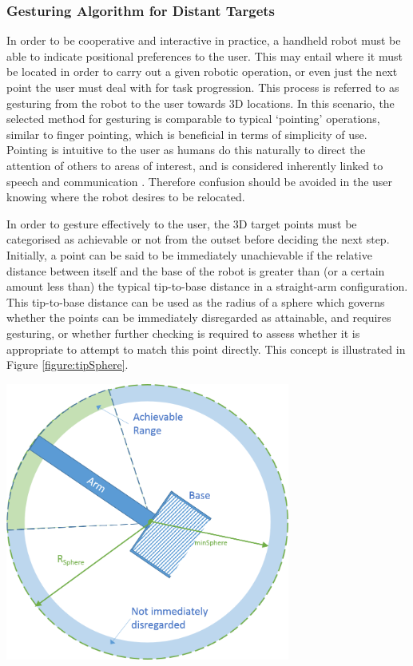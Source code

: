 \documentclass[11pt]{article}
\begin{document}
\subsubsection{Gesturing Algorithm for Distant Targets}
In order to be cooperative and interactive in practice, a handheld robot must be able to indicate positional preferences to the user. This may entail where it must be located in order to carry out a given robotic operation, or even just the next point the user must deal with for task progression. This process is referred to as gesturing from the robot to the user towards 3D locations. In this scenario, the selected method for gesturing is comparable to typical `pointing' operations, similar to finger pointing, which is beneficial in terms of simplicity of use. Pointing is intuitive to the user as humans do this naturally to direct the attention of others to areas of interest, and is considered inherently linked to speech and communication \cite{butterworth2003}. Therefore confusion should be avoided in the user knowing where the robot desires to be relocated.

In order to gesture effectively to the user, the 3D target points must be categorised as achievable or not from the outset before deciding the next step. Initially, a point can be said to be immediately unachievable if the relative distance between itself and the base of the robot is greater than (or a certain amount less than) the typical tip-to-base distance in a straight-arm configuration. This tip-to-base distance can be used as the radius of a sphere which governs whether the points can be immediately disregarded as attainable, and requires gesturing, or whether further checking is required to assess whether it is appropriate to attempt to match this point directly. This concept is illustrated in Figure \ref{figure:tipSphere}.

\begin{center}
\includegraphics[width=0.7\textwidth]{images/tipSphere2.png}
\label{figure:tipSphere}
\end{center}
\end{document}
